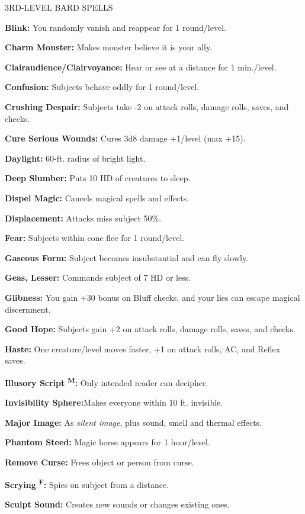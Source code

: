 \documentclass{article}
\begin{document}
3RD-LEVEL BARD SPELLS

\textbf{Blink:} You randomly vanish and reappear for 1 round/level.

\textbf{Charm Monster: }Makes monster believe it is your ally.

\textbf{Clairaudience/Clairvoyance:} Hear or see at a distance for 1 min./level.

\textbf{Confusion:} Subjects behave oddly for 1 round/level.

\textbf{Crushing Despair:} Subjects take -2 on attack rolls, damage rolls, saves, 
and checks.

\textbf{Cure Serious Wounds:} Cures 3d8 damage +1/level (max +15).

\textbf{Daylight:} 60-ft. radius of bright light.

\textbf{Deep Slumber:} Puts 10 HD of creatures to sleep.

\textbf{Dispel Magic:} Cancels magical spells and effects.

\textbf{Displacement:} Attacks miss subject 50\%.

\textbf{Fear:} Subjects within cone flee for 1 round/level.

\textbf{Gaseous Form:} Subject becomes insubstantial and can fly slowly.

\textbf{Geas, Lesser:} Commands subject of 7 HD or less.

\textbf{Glibness:} You gain +30 bonus on Bluff checks, and your lies can escape 
magical discernment.

\textbf{Good Hope:} Subjects gain +2 on attack rolls, damage rolls, saves, and 
checks.

\textbf{Haste: }One creature/level moves faster, +1 on attack rolls, AC, and Reflex 
saves.

\textbf{Illusory Script }\textsuperscript{\textbf{M}}\textbf{:} Only intended reader 
can decipher.

\textbf{Invisibility Sphere:}Makes everyone within 10 ft. invisible.

\textbf{Major Image:} As \textit{silent image}, plus sound, smell and thermal effects.

\textbf{Phantom Steed: }Magic horse appears for 1 hour/level.

\textbf{Remove Curse:} Frees object or person from curse.

\textbf{Scrying }\textsuperscript{\textbf{F}}\textbf{:} Spies on subject from a 
distance.

\textbf{Sculpt Sound:} Creates new sounds or changes existing ones.
\end{document}
